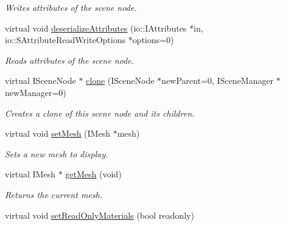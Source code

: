 \begin{DoxyCompactItemize}
\begin{DoxyCompactList}\small\item\em Writes attributes of the scene node. \end{DoxyCompactList}\item 
\hypertarget{classirr_1_1scene_1_1_c_cube_scene_node_a3a93ddbf0bc8af81b9680e748e8d26e9}{virtual void \hyperlink{classirr_1_1scene_1_1_c_cube_scene_node_a3a93ddbf0bc8af81b9680e748e8d26e9}{deserialize\-Attributes} (io\-::\-I\-Attributes $\ast$in, io\-::\-S\-Attribute\-Read\-Write\-Options $\ast$options=0)}\label{classirr_1_1scene_1_1_c_cube_scene_node_a3a93ddbf0bc8af81b9680e748e8d26e9}

\begin{DoxyCompactList}\small\item\em Reads attributes of the scene node. \end{DoxyCompactList}\item 
\hypertarget{classirr_1_1scene_1_1_c_cube_scene_node_ae22225a667cd3603f992cfa1341aa0ae}{virtual I\-Scene\-Node $\ast$ \hyperlink{classirr_1_1scene_1_1_c_cube_scene_node_ae22225a667cd3603f992cfa1341aa0ae}{clone} (I\-Scene\-Node $\ast$new\-Parent=0, I\-Scene\-Manager $\ast$new\-Manager=0)}\label{classirr_1_1scene_1_1_c_cube_scene_node_ae22225a667cd3603f992cfa1341aa0ae}

\begin{DoxyCompactList}\small\item\em Creates a clone of this scene node and its children. \end{DoxyCompactList}\item 
\hypertarget{classirr_1_1scene_1_1_c_cube_scene_node_a5096b249dd7b81791ea1f9d7659344b3}{virtual void \hyperlink{classirr_1_1scene_1_1_c_cube_scene_node_a5096b249dd7b81791ea1f9d7659344b3}{set\-Mesh} (I\-Mesh $\ast$mesh)}\label{classirr_1_1scene_1_1_c_cube_scene_node_a5096b249dd7b81791ea1f9d7659344b3}

\begin{DoxyCompactList}\small\item\em Sets a new mesh to display. \end{DoxyCompactList}\item 
\hypertarget{classirr_1_1scene_1_1_c_cube_scene_node_a4fcfdcea9dab153b3ce458668a5f274e}{virtual I\-Mesh $\ast$ \hyperlink{classirr_1_1scene_1_1_c_cube_scene_node_a4fcfdcea9dab153b3ce458668a5f274e}{get\-Mesh} (void)}\label{classirr_1_1scene_1_1_c_cube_scene_node_a4fcfdcea9dab153b3ce458668a5f274e}

\begin{DoxyCompactList}\small\item\em Returns the current mesh. \end{DoxyCompactList}\item 
\hypertarget{classirr_1_1scene_1_1_c_cube_scene_node_a268aa9ee4192a816c7ca31dc04bce2cd}{virtual void \hyperlink{classirr_1_1scene_1_1_c_cube_scene_node_a268aa9ee4192a816c7ca31dc04bce2cd}{set\-Read\-Only\-Materials} (bool readonly)}\label{classirr_1_1scene_1_1_c_cube_scene_node_a268aa9ee4192a816c7ca31dc04bce2cd}


\end{DoxyCompactItemize}

